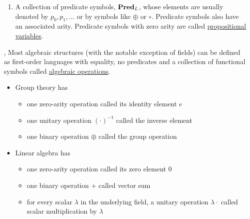 \begin{definition}
\begin{description}
\begin{enumerate}
      \item A collection of predicate symbols, $\operatorname{\mathbf{Pred}}_L$, whose elements are usually denoted by $p_0, p_1, \ldots$ or by symbols like $\oplus$ or $\circ$. Predicate symbols also have an associated arity. Predicate symbols with zero arity are called \uline{propositional variables}.
    \end{enumerate}
  \end{description}
\end{definition}

\begin{example}\label{ex:algebraic_theory_language}\cite[remark 2.1.4]{Leinster2014},\cite[21]{Lectures:logic_programming}
  Most algebraic structures (with the notable exception of fields) can be defined as first-order languages with equality, no predicates and a collection of functional symbols called \uline{algebraic operations}.
  \begin{itemize}
    \item Group theory has
    \begin{itemize}
      \item one zero-arity operation called its identity element $e$
      \item one unitary operation $(\cdot)^{-1}$ called the inverse element
      \item one binary operation $\oplus$ called the group operation
    \end{itemize}

    \item Linear algebra has
    \begin{itemize}
      \item one zero-arity operation called its zero element $0$
      \item one binary operation $+$ called vector sum
      \item for every scalar $\lambda$ in the underlying field, a unitary operation $\lambda \cdot$ called scalar multiplication by $\lambda$
    \end{itemize}
  \end{itemize}
\end{example}

